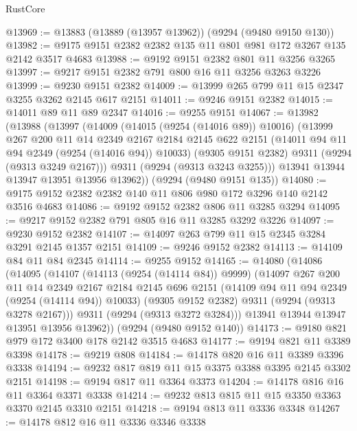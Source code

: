 \begin{lexlean}{RustCore}
\begin{coremodule}
@13969 := @13883 (@13889 (@13957 @13962)) (@9294 (@9480 @9150 @130))
@13982 := @9175 @9151 @2382 @2382 @135 @11 @801 @981 @172 @3267 @135 @2142 @3517 @4683
@13988 := @9192 @9151 @2382 @801 @11 @3256 @3265
@13997 := @9217 @9151 @2382 @791 @800 @16 @11 @3256 @3263 @3226
@13999 := @9230 @9151 @2382
@14009 := @13999 @265 @799 @11 @15 @2347 @3255 @3262 @2145 @617 @2151
@14011 := @9246 @9151 @2382
@14015 := @14011 @89 @11 @89 @2347
@14016 := @9255 @9151
@14067 := @13982
    (@13988
      (@13997
        (@14009
          (@14015 (@9254 (@14016 @89)) @10016)
          (@13999
            @267
            @200
            @11
            @14
            @2349
            @2167
            @2184
            @2145
            @622
            @2151
            (@14011 @94 @11 @94 @2349 (@9254 (@14016 @94)) @10033)
            (@9305 @9151 @2382)
            @9311
            (@9294 (@9313 @3249 @2167)))
          @9311
          (@9294 (@9313 @3243 @3255)))
        @13941
        @13944
        @13947
        @13951
        @13956
        @13962))
    (@9294 (@9480 @9151 @135))
@14080 := @9175 @9152 @2382 @2382 @140 @11 @806 @980 @172 @3296 @140 @2142 @3516 @4683
@14086 := @9192 @9152 @2382 @806 @11 @3285 @3294
@14095 := @9217 @9152 @2382 @791 @805 @16 @11 @3285 @3292 @3226
@14097 := @9230 @9152 @2382
@14107 := @14097 @263 @799 @11 @15 @2345 @3284 @3291 @2145 @1357 @2151
@14109 := @9246 @9152 @2382
@14113 := @14109 @84 @11 @84 @2345
@14114 := @9255 @9152
@14165 := @14080
    (@14086
      (@14095
        (@14107
          (@14113 (@9254 (@14114 @84)) @9999)
          (@14097
            @267
            @200
            @11
            @14
            @2349
            @2167
            @2184
            @2145
            @696
            @2151
            (@14109 @94 @11 @94 @2349 (@9254 (@14114 @94)) @10033)
            (@9305 @9152 @2382)
            @9311
            (@9294 (@9313 @3278 @2167)))
          @9311
          (@9294 (@9313 @3272 @3284)))
        @13941
        @13944
        @13947
        @13951
        @13956
        @13962))
    (@9294 (@9480 @9152 @140))
@14173 := @9180 @821 @979 @172 @3400 @178 @2142 @3515 @4683
@14177 := @9194 @821 @11 @3389 @3398
@14178 := @9219 @808
@14184 := @14178 @820 @16 @11 @3389 @3396 @3338
@14194 := @9232 @817 @819 @11 @15 @3375 @3388 @3395 @2145 @3302 @2151
@14198 := @9194 @817 @11 @3364 @3373
@14204 := @14178 @816 @16 @11 @3364 @3371 @3338
@14214 := @9232 @813 @815 @11 @15 @3350 @3363 @3370 @2145 @3310 @2151
@14218 := @9194 @813 @11 @3336 @3348
@14267 := @14178
    @812
    @16
    @11
    @3336
    @3346
    @3338

\end{coremodule}
\end{lexlean}
